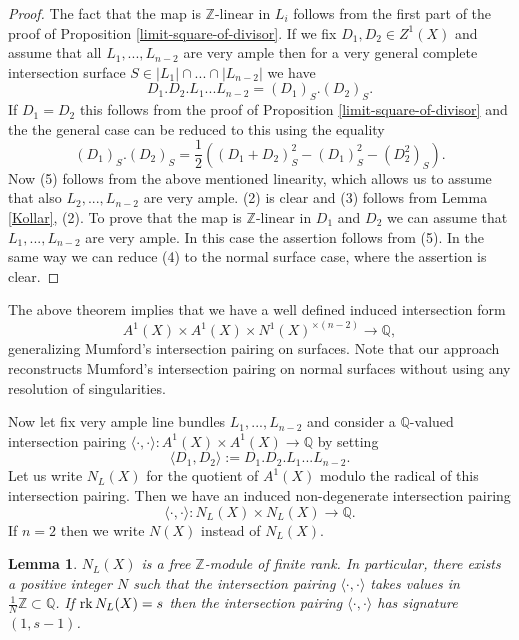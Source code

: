 \documentclass[twoside, 11pt]{article}
\theoremstyle{plain}
\newtheorem{Lemma}[Thm]{\sc Lemma}
\theoremstyle{definition}
\theoremstyle{remark}
\newcommand{\ZZ}{{\mathbb Z}}
\newcommand{\QQ}{{\mathbb Q}}
\newcommand{\rk}{{\mathop{\rm rk \,}}}
\begin{document}
\begin{proof}
The fact that the map is $\ZZ$-linear in $L_i$ follows from the first part of the proof of Proposition
\ref{limit-square-of-divisor}. 
If we fix $D_1, D_2\in  Z^1 (X)$ and assume that  all $L_1,...,L_{n-2}$ are very ample
then  for a very general complete intersection surface  $S\in |L_1|\cap ...\cap |L_{n-2}|$ we have 
$$D_1.D_2.L_1...L_{n-2} =(D_1)_S.(D_2)_S.$$
If $D_1=D_2$ this follows from the proof of Proposition \ref{limit-square-of-divisor}
and the the general case can be reduced to this using the equality
$$ (D_1)_S. (D_2)_S= \frac{1}{2}\left((D_1+D_2)_S^2   -(D_1)_S^2-(D_2^2)_S\right).$$
Now (5) follows from the above mentioned linearity, which allows us to assume  that also $L_2,...,L_{n-2}$ are very ample.
(2) is clear and (3) follows from Lemma \ref{Kollar}, (2). To prove that the map is $\ZZ$-linear in $D_1$ and $D_2$ we can assume that $L_1,...,L_{n-2}$ are very ample. In this case the assertion follows from (5). In the same way we can reduce
(4) to the normal surface case, where the assertion is clear.
\end{proof}

The above theorem implies that we have a well defined induced intersection form
$$A^1(X)\times A^1(X)\times N^1(X)^{\times (n-2)}\to \QQ ,$$
generalizing Mumford's intersection pairing on surfaces. Note that our approach reconstructs Mumford's intersection pairing on normal surfaces without using any resolution of singularities.

\medskip


\medskip

Now let fix very ample line bundles $L_1,...,L_{n-2}$ and consider 
 a $\QQ$-valued intersection pairing $\langle \cdot, \cdot \rangle : A^1(X)\times A^1(X)\to \QQ$ by setting
$$\langle D_1, D_2\rangle := D_1.D_2.L_1...L_{n-2} .$$
Let us write $N_L(X)$ for the quotient of $A^1 (X)$ modulo the radical of this intersection pairing. 
Then we have an induced non-degenerate intersection pairing
$$\langle \cdot, \cdot \rangle : N_L(X)\times N_L(X)\to \QQ.$$
If $n=2$ then we write $N(X)$ instead of $N_L(X)$.

\begin{Lemma}\label{finite-generation}
$N_L(X)$ is a free $\ZZ$-module of finite rank. In particular, there exists a positive integer $N$ such that the intersection pairing $\langle \cdot , \cdot \rangle$ takes values in $\frac{1}{N}\ZZ\subset \QQ$.  If  $\rk N_L (X)=s$ then the intersection pairing $\langle \cdot , \cdot \rangle$ has signature $(1, s-1)$.
\end{Lemma} 
\end{document}
